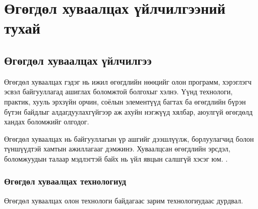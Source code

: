 
\chapter{Өгөгдөл хуваалцах үйлчилгээний тухай} %
\label{Chapter1} %
\pagecolor{white}

\newcommand{\keyword}[1]{\textbf{#1}}
\newcommand{\tabhead}[1]{\textbf{#1}}
\newcommand{\code}[1]{\texttt{#1}}
\newcommand{\file}[1]{\texttt{\bfseries#1}}
\newcommand{\option}[1]{\texttt{\itshape#1}}


\section{Өгөгдөл хуваалцах үйлчилгээ}
Өгөгдөл хуваалцах гэдэг нь ижил өгөгдлийн нөөцийг олон программ, хэрэглэгч эсвэл байгууллагад ашиглах боломжтой болгохыг хэлнэ.
Үүнд технологи, практик, хууль эрхзүйн орчин, соёлын элементүүд багтах ба өгөгдлийн бүрэн бүтэн байдлыг алдагдуулахгүйгээр аж ахуйн нэгжүүд хялбар, аюулгүй өгөгдөлд хандах боломжийг олгодог.

Өгөгдөл хуваалцах нь байгууллагын үр ашгийг дээшлүүлж, борлуулагчид болон түншүүдтэй хамтын ажиллагааг дэмжинэ. Хуваалцсан өгөгдлийн эрсдэл, боломжуудын талаар мэдлэгтэй байх нь үйл явцын салшгүй хэсэг юм.
\cite{AWSDataSharing}.

\subsection{Өгөгдөл хуваалцах технологиуд}
Өгөгдөл хуваалцах олон технологи байдагаас зарим технологиудаас дурдвал.

